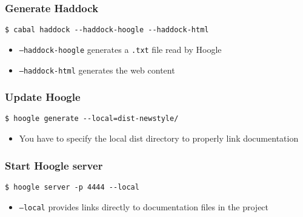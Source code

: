 \documentclass{beamer}
\newcommand{\code}[1]{{\color{secondary} \texttt{#1}}}
\begin{document}
  \begin{frame}[fragile]
    \frametitle{Generate Haddock}
    \begin{verbatim}
$ cabal haddock --haddock-hoogle --haddock-html
    \end{verbatim}
    \begin{itemize}
        \item \code{--haddock-hoogle} generates a \code{.txt} file read by Hoogle
        \item \code{--haddock-html} generates the web content
    \end{itemize}
  \end{frame}

  \begin{frame}[fragile]
    \frametitle{Update Hoogle}
    \begin{verbatim}
$ hoogle generate --local=dist-newstyle/
    \end{verbatim}
    \begin{itemize}
        \item You have to specify the local dist directory to properly link documentation
    \end{itemize}
  \end{frame}

  \begin{frame}[fragile]
    \frametitle{Start Hoogle server}
    \begin{verbatim}
$ hoogle server -p 4444 --local
    \end{verbatim}
    \begin{itemize}
        \item \code{--local} provides links directly to documentation files in the project
    \end{itemize}
  \end{frame}
\end{document}
